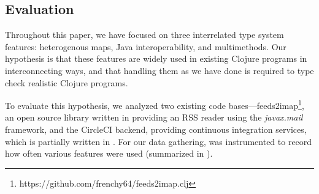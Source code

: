 %
%
%

\subsection{Evaluation}
\label{sec:casestudy}

Throughout this paper, we have focused on three interrelated type
system features: heterogenous maps, Java interoperability, and
multimethods. Our hypothesis is that these features are widely used in
existing Clojure programs in interconnecting ways, and that handling
them as we have done is required to type check realistic Clojure
programs.

To evaluate this hypothesis, we analyzed two existing \coretyped{}
code bases---feeds2imap\footnote{https://github.com/frenchy64/feeds2imap.clj},
an open source library written in \coretyped{}
providing an RSS reader using the \emph{javax.mail} framework, and
the
CircleCI \cite{CircleCI} backend,
providing continuous integration services, which
is partially written in \coretyped{}.
For our data gathering, 
\coretyped{} was instrumented to record how often
various features were used (summarized in 
).

